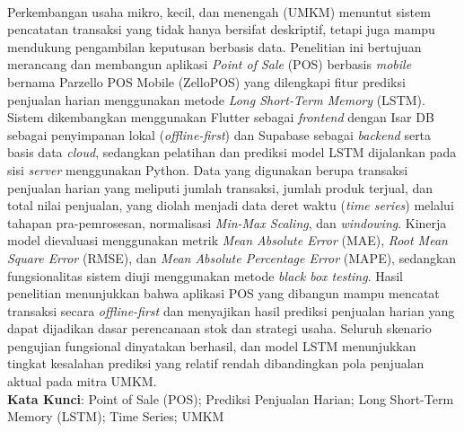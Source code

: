 \documentclass[a4paper,10pt,onecolumn]{article}
\begin{document}
\\[0.2cm]
{\fontsize{9pt}{11pt}\selectfont
Perkembangan usaha mikro, kecil, dan menengah (UMKM) menuntut sistem pencatatan transaksi yang tidak hanya bersifat deskriptif, tetapi juga mampu mendukung pengambilan keputusan berbasis data. Penelitian ini bertujuan merancang dan membangun aplikasi \textit{Point of Sale} (POS) berbasis \textit{mobile} bernama Parzello POS Mobile (ZelloPOS) yang dilengkapi fitur prediksi penjualan harian menggunakan metode \textit{Long Short-Term Memory} (LSTM). Sistem dikembangkan menggunakan Flutter sebagai \textit{frontend} dengan Isar DB sebagai penyimpanan lokal (\textit{offline-first}) dan Supabase sebagai \textit{backend} serta basis data \textit{cloud}, sedangkan pelatihan dan prediksi model LSTM dijalankan pada sisi \textit{server} menggunakan Python. Data yang digunakan berupa transaksi penjualan harian yang meliputi jumlah transaksi, jumlah produk terjual, dan total nilai penjualan, yang diolah menjadi data deret waktu (\textit{time series}) melalui tahapan pra-pemrosesan, normalisasi \textit{Min-Max Scaling}, dan \textit{windowing}. Kinerja model dievaluasi menggunakan metrik \textit{Mean Absolute Error} (MAE), \textit{Root Mean Square Error} (RMSE), dan \textit{Mean Absolute Percentage Error} (MAPE), sedangkan fungsionalitas sistem diuji menggunakan metode \textit{black box testing}. Hasil penelitian menunjukkan bahwa aplikasi POS yang dibangun mampu mencatat transaksi secara \textit{offline-first} dan menyajikan hasil prediksi penjualan harian yang dapat dijadikan dasar perencanaan stok dan strategi usaha. Seluruh skenario pengujian fungsional dinyatakan berhasil, dan model LSTM menunjukkan tingkat kesalahan prediksi yang relatif rendah dibandingkan pola penjualan aktual pada mitra UMKM.\\[0.3cm]
\noindent\textbf{Kata Kunci}: Point of Sale (POS); Prediksi Penjualan Harian; Long Short-Term Memory (LSTM); Time Series; UMKM
}

\vspace{0.5cm}
\end{document}
